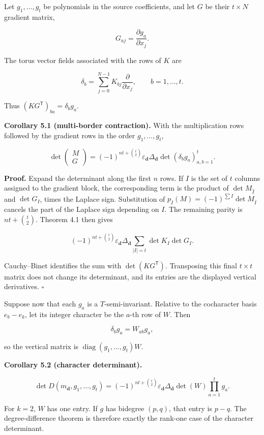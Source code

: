 \documentclass[
  11pt,
  a4paper,
]{article}
\begin{document}
Let \(g_1,\ldots,g_t\) be polynomials in the source coefficients, and
let \(G\) be their \(t\times N\) gradient matrix,

\[
 G_{aj}=\frac{\partial g_a}{\partial x_j}.
\]

The torus vector fields associated with the rows of \(K\) are

\[
 \delta_b=\sum_{j=0}^{N-1}K_{bj}\frac{\partial}{\partial x_j},
 \qquad b=1,\ldots,t.
\]

Thus \((KG^{\mathsf T})_{ba}=\delta_bg_a\).

\textbf{Corollary 5.1 (multi-border contraction).} With the
multiplication rows followed by the gradient rows in the order
\(g_1,\ldots,g_t\),

\[
 \boxed{
 \det\begin{pmatrix}M\\G\end{pmatrix}
 =(-1)^{nt+\binom t2}\varepsilon_{\mathbf d}
   \Delta_{\mathbf d}\det(\delta_bg_a)_{a,b=1}^t.
 }
\]

\textbf{Proof.} Expand the determinant along the first \(n\) rows. If
\(I\) is the set of \(t\) columns assigned to the gradient block, the
corresponding term is the product of \(\det M_{\widehat I}\) and
\(\det G_I\), times the Laplace sign. Substitution of
\(p_I(M)=(-1)^{\sum I}\det M_{\widehat I}\) cancels the part of the
Laplace sign depending on \(I\). The remaining parity is
\(nt+\binom t2\). Theorem 4.1 then gives

\[
 (-1)^{nt+\binom t2}\varepsilon_{\mathbf d}\Delta_{\mathbf d}
 \sum_{|I|=t}\det K_I\det G_I.
\]

Cauchy--Binet identifies the sum with \(\det(KG^{\mathsf T})\).
Transposing this final \(t\times t\) matrix does not change its
determinant, and its entries are the displayed vertical derivatives.
\(\square\)

Suppose now that each \(g_a\) is a \(T\)-semi-invariant. Relative to the
cocharacter basis \(e_b-e_k\), let its integer character be the \(a\)-th
row of \(W\). Then

\[
 \delta_bg_a=W_{ab}g_a,
\]

so the vertical matrix is \(\operatorname{diag}(g_1,\ldots,g_t)W\).

\textbf{Corollary 5.2 (character determinant).}

\[
 \boxed{
 \det D(m_{\mathbf d},g_1,\ldots,g_t)
 =(-1)^{nt+\binom t2}\varepsilon_{\mathbf d}
   \Delta_{\mathbf d}\det(W)\prod_{a=1}^tg_a.
 }
\]

For \(k=2\), \(W\) has one entry. If \(g\) has bidegree \((p,q)\), that
entry is \(p-q\). The degree-difference theorem is therefore exactly the
rank-one case of the character determinant.
\end{document}
